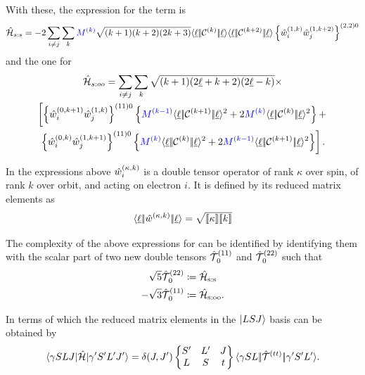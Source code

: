 \documentclass{article}
\begin{document}
     With these, the expression for the \spinspin term is \cite{judd_intra-atomic_1968}
    \begin{multline}
    \hat{\mathcal{H}}_{s:s} = -2 \sum_{i\neq{j}}
        \sum_k \textcolor{blue}{M^{(k)}}
            \sqrt{(k+1)(k+2)(2k+3)} 
            \langle \underbar{$\ell$}|\!|\mathcal{C}^{(k)}|\!|\underbar{$\ell$}\rangle 
            \langle \underbar{$\ell$}|\!|\mathcal{C}^{(k+2)}|\!|\underbar{$\ell$}\rangle
            \left\{
                \hat{w}_{i}^{({1},{k})}
                \hat{w}_{j}^{({1},{k+2})}
            \right\}^{(2,2)0}
    \end{multline}
    and the one for \soo {}
    \begin{multline}
        \ham_{s:oo} = \sum_{i\neq{j}} 
            \sum_k 
                \sqrt{(k+1)(2\lorb+k+2)(2\lorb-k)}  \times \\ 
        \left[ \left\{ \wdouble{i}{0}{k+1} \wdouble{j}{1}{k} \right\}^{(11)0} 
        \left\{ \Mk{k-1}
            \redbraopket{\lorb}
                {\Ck{k+1}}
                {\lorb}^2
            +
            2 \Mk{k} \redbraopket{\lorb}{\Ck{k}}{\lorb}^2
        \right\} + \right. \\
        \left.
            \left\{ \wdouble{i}{0}{k}\wdouble{j}{1}{k+1} \right\}^{(11)0} 
                \left\{ \Mk{k} 
                    \redbraopket{\lorb}{\Ck{k}}{\lorb}^2
                    + 2 \Mk{k-1}
                    \redbraopket{\lorb}{\Ck{k+1}}{\lorb}^2
                \right\}
        \right].
    \end{multline} 

    In the expressions above $\hat{w}_{i}^{({\kappa},{k})}$ is a double tensor operator of rank $\kappa$ over spin, of rank $k$ over orbit, and acting on electron $i$. It is defined by its reduced matrix elements as
    \begin{equation} 
    \langle \underbar{$\ell$}|\!|\hat{w}_{}^{({\kappa},{k})}|\!|\underbar{$\ell$}\rangle
        = \sqrt{[\![\kappa]\!]
            [\![k]\!]
        }
    \end{equation} 

    The complexity of the above expressions for can be identified by identifying them with the scalar part of two new double tensors $\hat{\mathcal{T}}^{(11)}_{\,0}$ and $\hat{\mathcal{T}}^{(22)}_{\,0}$ such that
    \begin{align}
    \sqrt{5}\hat{\mathcal{T}}^{(22)}_{\,0} &\coloneqq \hat{\mathcal{H}}_{\text{s:s}} \\
    -\sqrt{3}\hat{\mathcal{T}}^{(11)}_{\,0} &\coloneqq \hat{\mathcal{H}}_\text{s:oo}.
    \end{align}

    In terms of which the reduced matrix elements in the $|LSJ\rangle$ basis can be obtained by
    \begin{equation}
        \langle \gamma{SLJ}|\hat{\mathcal{H}}|\gamma'{S'L'J'}\rangle = \delta(J,J') \begin{Bmatrix} S' & L' & J \\ L & S & t \end{Bmatrix} \langle \gamma{SL}|\!|\hat{\mathcal{T}}^{(tt)}_{\,}|\!|\gamma'{S'L'}\rangle.
    \label{SLtoSLJ for Ttt}
    \end{equation}
\end{document}
